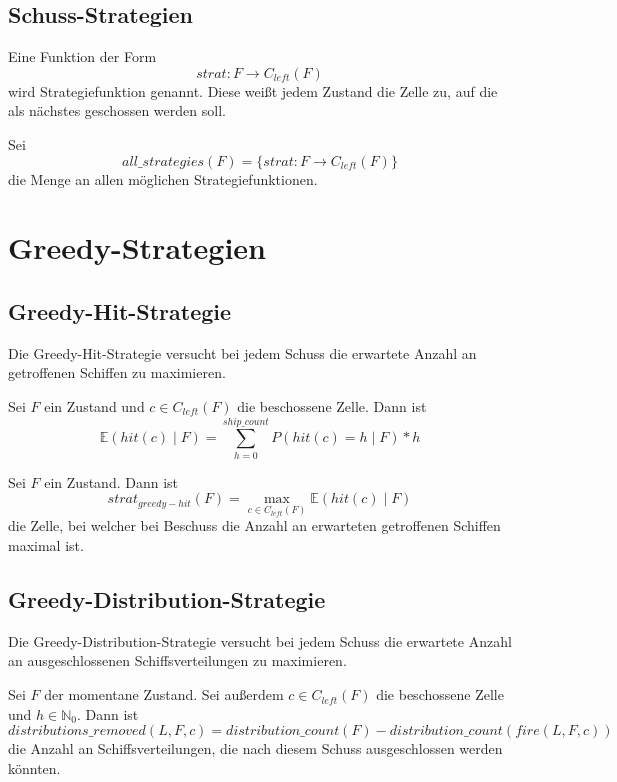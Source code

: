 \documentclass[a4paper,12pt]{llncs}
\newcommand{\N}{{\mathbb{N}}}
\numberwithin{equation}{section}
\begin{document}
\subsection{Schuss-Strategien}

\begin{definition}
Eine Funktion der Form
\[
strat \colon F \rightarrow C_{left}(F)
\]
wird Strategiefunktion genannt. Diese weißt jedem Zustand die Zelle zu, auf die als nächstes geschossen werden soll.
\end{definition}

\begin{definition}
Sei
\[
all\_strategies(F)=\{ strat \colon F \rightarrow C_{left}(F) \}
\]
die Menge an allen möglichen Strategiefunktionen.
\end{definition}

\section{Greedy-Strategien}

\subsection{Greedy-Hit-Strategie}
Die Greedy-Hit-Strategie versucht bei jedem Schuss die erwartete Anzahl an getroffenen Schiffen zu maximieren.

\begin{definition}
Sei $F$ ein Zustand und $c \in C_{left}(F)$ die beschossene Zelle.
Dann ist
\[
\mathds{E}(hit(c) \mid F)=\sum_{h=0}^{ship\_count} P(hit(c)=h \mid F) * h
\]
\end{definition}

\begin{definition}
Sei $F$ ein Zustand.
Dann ist
\[
strat_{greedy-hit}(F)=\max_{c \in C_{left}(F)} \mathds{E}(hit(c) \mid F)
\]
die Zelle, bei welcher bei Beschuss die Anzahl an erwarteten getroffenen Schiffen maximal ist.
\end{definition}

\subsection{Greedy-Distribution-Strategie}
Die Greedy-Distribution-Strategie versucht bei jedem Schuss die erwartete Anzahl an ausgeschlossenen Schiffsverteilungen zu maximieren.

\begin{definition}
Sei $F$ der momentane Zustand.
Sei außerdem $c \in C_{left}(F)$ die beschossene Zelle und $h \in \N_0$.
Dann ist
\[
distributions\_removed(L, F, c)=distribution\_count(F) - distribution\_count(fire(L, F,c))
\]
die Anzahl an Schiffsverteilungen, die nach diesem Schuss ausgeschlossen werden könnten.
\end{definition}
\end{document}
